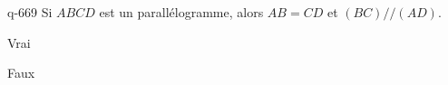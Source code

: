 \begin{truefalse}{q-669}
 Si $ABCD$ est un parallélogramme, alors $AB=CD$ et $(BC)//(AD)$.
\item* Vrai
\item Faux
\end{truefalse}

